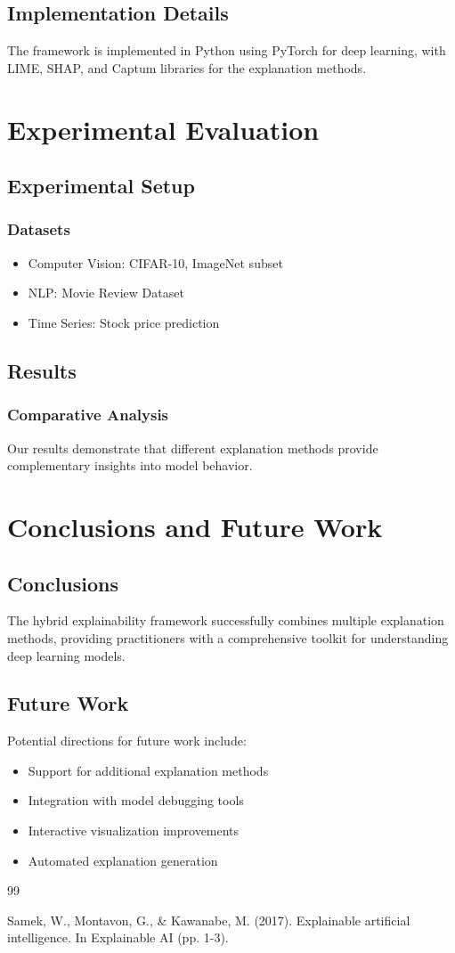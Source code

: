 \documentclass[12pt,a4paper]{report}
\begin{document}
\section{Implementation Details}
The framework is implemented in Python using PyTorch for deep learning, with LIME, SHAP, and Captum libraries for the explanation methods.

\chapter{Experimental Evaluation}

\section{Experimental Setup}
\subsection{Datasets}
\begin{itemize}
    \item Computer Vision: CIFAR-10, ImageNet subset
    \item NLP: Movie Review Dataset
    \item Time Series: Stock price prediction
\end{itemize}

\section{Results}
\subsection{Comparative Analysis}
Our results demonstrate that different explanation methods provide complementary insights into model behavior.

\chapter{Conclusions and Future Work}

\section{Conclusions}
The hybrid explainability framework successfully combines multiple explanation methods, providing practitioners with a comprehensive toolkit for understanding deep learning models.

\section{Future Work}
Potential directions for future work include:
\begin{itemize}
    \item Support for additional explanation methods
    \item Integration with model debugging tools
    \item Interactive visualization improvements
    \item Automated explanation generation
\end{itemize}


\begin{thebibliography}{99}

 Samek, W., Montavon, G., & Kawanabe, M. (2017). Explainable artificial intelligence. In Explainable AI (pp. 1-3).

\end{thebibliography}
\end{document}
